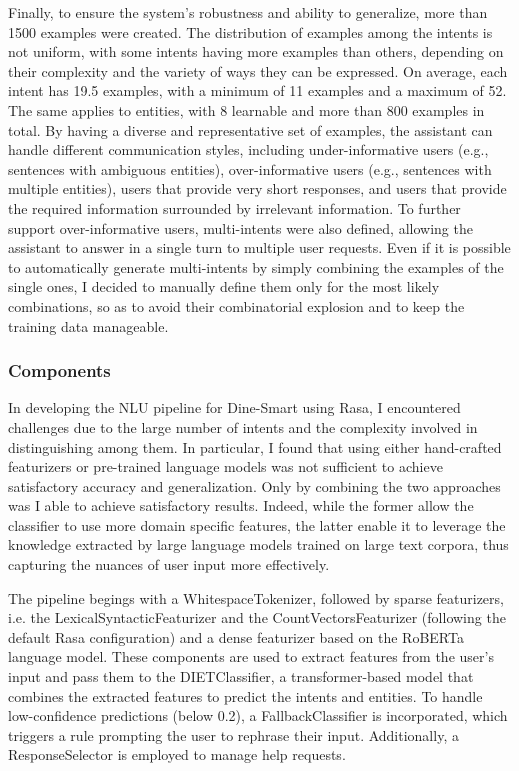 \documentclass[twocolumn]{article}
\begin{document}
Finally, to ensure the system's robustness and ability to generalize, more than 1500 examples were created. The distribution of examples among the intents is not uniform, with some intents having more examples than others, depending on their complexity and the variety of ways they can be expressed. On average, each intent has 19.5 examples, with a minimum of 11 examples and a maximum of 52. The same applies to entities, with 8 learnable and more than 800 examples in total. By having a diverse and representative set of examples, the assistant can handle different communication styles, including under-informative users (e.g., sentences with ambiguous entities), over-informative users (e.g., sentences with multiple entities), users that provide very short responses, and users that provide the required information surrounded by irrelevant information. To further support over-informative users, multi-intents were also defined, allowing the assistant to answer in a single turn to multiple user requests. Even if it is possible to automatically generate multi-intents by simply combining the examples of the single ones, I decided to manually define them only for the most likely combinations, so as to avoid their combinatorial explosion and to keep the training data manageable.

\subsubsection*{Components}

In developing the NLU pipeline for Dine-Smart using Rasa, I encountered challenges due to the large number of intents and the complexity involved in distinguishing among them. In particular, I found that using either hand-crafted featurizers or pre-trained language models was not sufficient to achieve satisfactory accuracy and generalization. Only by combining the two approaches was I able to achieve satisfactory results. Indeed, while the former allow the classifier to use more domain specific features, the latter enable it to leverage the knowledge extracted by large language models trained on large text corpora, thus capturing the nuances of user input more effectively.

The pipeline begings with a WhitespaceTokenizer, followed by sparse featurizers, i.e. the LexicalSyntacticFeaturizer and the CountVectorsFeaturizer (following the default Rasa configuration) and a dense featurizer based on the RoBERTa language model. These components are used to extract features from the user's input and pass them to the DIETClassifier, a transformer-based model that combines the extracted features to predict the intents and entities. To handle low-confidence predictions (below 0.2), a FallbackClassifier is incorporated, which triggers a rule prompting the user to rephrase their input. Additionally, a ResponseSelector is employed to manage help requests.
\end{document}

